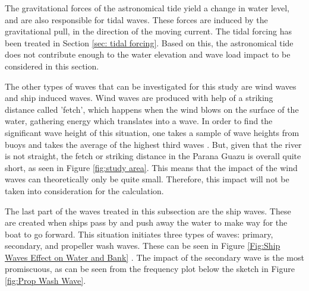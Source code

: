The gravitational forces of the astronomical tide yield a change in water level, and are also responsible for tidal waves. These forces are induced by the gravitational pull, in the direction of the moving current. The tidal forcing has been treated in Section \ref{sec: tidal forcing}. Based on this, the astronomical tide does not contribute enough to the water elevation and wave load impact to be considered in this section.

The other types of waves that can be investigated for this study are wind waves and ship induced waves. Wind waves are produced with help of a striking distance called 'fetch', which happens when the wind blows on the surface of the water, gathering energy which translates into a wave. In order to find the significant wave height of this situation, one takes a sample of wave heights from buoys and takes the average of the highest third waves \autocite{arrigaLecture2CIEM40002025}. But, given that the river is not straight, the fetch or striking distance in the Parana Guazu is overall quite short, as seen in Figure \ref{fig:study area}. This means that the impact of the wind waves can theoretically only be quite small. Therefore, this impact will not be taken into consideration for the calculation. 

The last part of the waves treated in this subsection are the ship waves. These are created when ships pass by and push away the water to make way for the boat to go forward. This situation initiates three types of waves: primary, secondary, and propeller wash waves. These can be seen in Figure \ref{Fig:Ship Waves Effect on Water and Bank} \autocite{antoniniLecture12Ships2025}. The impact of the secondary wave is the most promiscuous, as can be seen from the frequency plot below the sketch in Figure \ref{fig:Prop Wash Wave}. 

